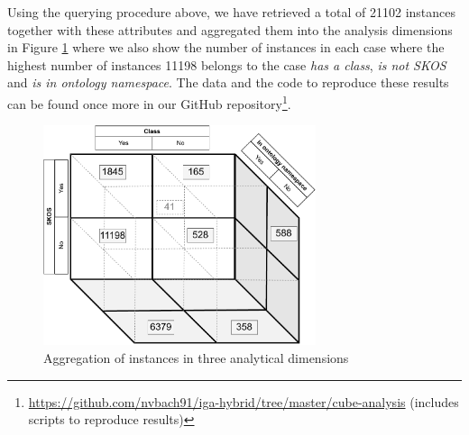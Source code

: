 Using the querying procedure above, we have retrieved a total of 21102 instances together with these attributes and aggregated them into the analysis dimensions in Figure \ref{fig:cube-aggregation} where we also show the number of instances in each case where the highest number of instances 11198 belongs to the case \textit{has a class}, \textit{is not SKOS} and \textit{is in ontology namespace}. The data and the code to reproduce these results can be found once more in our GitHub repository\footnote{\url{https://github.com/nvbach91/iga-hybrid/tree/master/cube-analysis} (includes scripts to reproduce results)}.

\begin{figure}[ht]
    \centering
    \includegraphics[width=8cm]{figures/cube-aggregation.pdf}
    \caption{Aggregation of instances in three analytical dimensions}
    \label{fig:cube-aggregation}
\end{figure}
